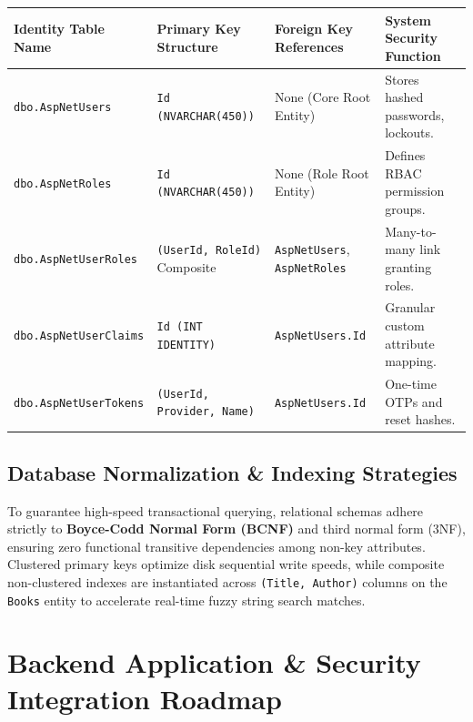 \documentclass[11pt,a4paper]{report}
\begin{document}
\vspace{10pt}
\noindent
\begin{center}
\renewcommand{\arraystretch}{1.25}
\begin{tabular}{|L{3.6cm}|L{3.4cm}|L{3.8cm}|L{4.2cm}|}
\hline
{}
\textbf{\color{white}Identity Table Name} & \textbf{\color{white}Primary Key Structure} & \textbf{\color{white}Foreign Key References} & \textbf{\color{white}System Security Function} \\
\hline
\texttt{dbo.AspNetUsers} & \texttt{Id (NVARCHAR(450))} & None (Core Root Entity) & Stores hashed passwords, lockouts. \\
\hline
{}
\texttt{dbo.AspNetRoles} & \texttt{Id (NVARCHAR(450))} & None (Role Root Entity) & Defines RBAC permission groups. \\
\hline
\texttt{dbo.AspNetUserRoles} & \texttt{(UserId, RoleId)} Composite & \texttt{AspNetUsers}, \texttt{AspNetRoles} & Many-to-many link granting roles. \\
\hline
{}
\texttt{dbo.AspNetUserClaims} & \texttt{Id (INT IDENTITY)} & \texttt{AspNetUsers.Id} & Granular custom attribute mapping. \\
\hline
\texttt{dbo.AspNetUserTokens} & \texttt{(UserId, Provider, Name)} & \texttt{AspNetUsers.Id} & One-time OTPs and reset hashes. \\
\hline
\end{tabular}
\end{center}

\section{Database Normalization \& Indexing Strategies}
To guarantee high-speed transactional querying, relational schemas adhere strictly to \textbf{Boyce-Codd Normal Form (BCNF)} and third normal form (3NF), ensuring zero functional transitive dependencies among non-key attributes. Clustered primary keys optimize disk sequential write speeds, while composite non-clustered indexes are instantiated across \texttt{(Title, Author)} columns on the \texttt{Books} entity to accelerate real-time fuzzy string search matches.

\newpage

\chapter{Backend Application \& Security Integration Roadmap}
\end{document}
